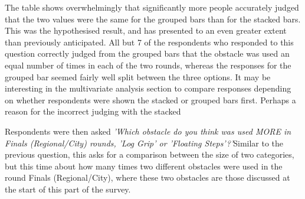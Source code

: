 \documentclass[
]{article}
\newenvironment{Shaded}{\begin{snugshade}}{\end{snugshade}}
\newcommand{\DecValTok}[1]{\textcolor[rgb]{0.00,0.00,0.81}{#1}}
\newcommand{\KeywordTok}[1]{\textcolor[rgb]{0.13,0.29,0.53}{\textbf{#1}}}
\newcommand{\NormalTok}[1]{#1}
\newcommand{\OperatorTok}[1]{\textcolor[rgb]{0.81,0.36,0.00}{\textbf{#1}}}
\newcommand{\StringTok}[1]{\textcolor[rgb]{0.31,0.60,0.02}{#1}}
\begin{document}
The table shows overwhelmingly that significantly more people accurately
judged that the two values were the same for the grouped bars than for
the stacked bars. This was the hypothesised result, and has presented to
an even greater extent than previously anticipated. All but 7 of the
respondents who responded to this question correctly judged from the
grouped bars that the obstacle was used an equal number of times in each
of the two rounds, whereas the responses for the grouped bar seemed
fairly well split between the three options. It may be interesting in
the multivariate analysis section to compare responses depending on
whether respondents were shown the stacked or grouped bars first.
Perhaps a reason for the incorrect judging with the stacked

Respondents were then asked
\textit{'Which obstacle do you think was used MORE in Finals (Regional/City) rounds, 'Log Grip' or 'Floating Steps'?'}Similar
to the previous question, this asks for a comparison between the size of
two categories, but this time about how many times two different
obstacles were used in the round Finals (Regional/City), where these two
obstacles are those discussed at the start of this part of the survey.

\begin{Shaded}
\end{Shaded}
\end{document}

